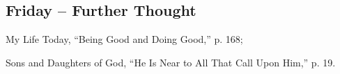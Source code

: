 \documentclass[a4paper, 10pt, twoside, headings=small]{scrartcl}
\begin{document}
\begin{multicols}{2}
\section*{Friday – Further Thought}

\setlength{\parindent}{0pt}My Life Today, “Being Good and Doing Good,” p. 168;

Sons and Daughters of God, “He Is Near to All That Call Upon Him,” p. 19.

\end{multicols}
\end{document}
